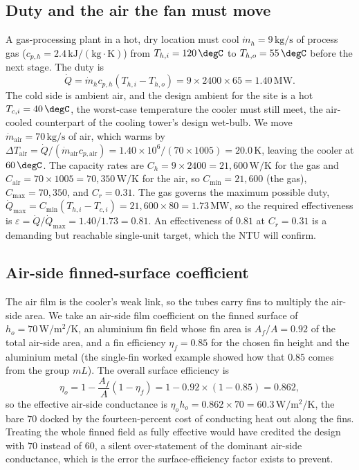 \subsection{Duty and the air the fan must move}

A gas-processing plant in a hot, dry location must cool $\dot{m}_h = 9\,\text{kg/s}$
of process gas ($c_{p,h} = 2.4\,\text{kJ}/(\text{kg}\cdot\si{\kelvin})$) from
$T_{h,i} = 120\,\degC$ to $T_{h,o} = 55\,\degC$ before the next stage. The duty is
\[
\dot{Q} = \dot{m}_h c_{p,h}(T_{h,i} - T_{h,o}) = 9\times 2400\times 65 = 1.40\,
\text{MW}.
\]
The cold side is ambient air, and the design ambient for the site is a hot
$T_{c,i} = 40\,\degC$, the worst-case temperature the cooler must still meet, the
air-cooled counterpart of the cooling tower's design wet-bulb. We move
$\dot{m}_{\text{air}} = 70\,\text{kg/s}$ of air, which warms by $\Delta T_{\text{
air}} = \dot{Q}/(\dot{m}_{\text{air}} c_{p,\text{air}}) = 1.40\times 10^6/(70\times
1005) = 20.0\,\si{\kelvin}$, leaving the cooler at $60\,\degC$. The capacity rates
are $C_h = 9\times 2400 = 21{,}600\,\si{\watt\per\kelvin}$ for the gas and
$C_{\text{air}} = 70\times 1005 = 70{,}350\,\si{\watt\per\kelvin}$ for the air, so
$C_{\min} = 21{,}600$ (the gas), $C_{\max} = 70{,}350$, and $C_r = 0.31$. The gas
governs the maximum possible duty, $\dot{Q}_{\max} = C_{\min}(T_{h,i} - T_{c,i}) =
21{,}600\times 80 = 1.73\,\text{MW}$, so the required effectiveness is
$\varepsilon = \dot{Q}/\dot{Q}_{\max} = 1.40/1.73 = 0.81$. An effectiveness of
$0.81$ at $C_r = 0.31$ is a demanding but reachable single-unit target, which the
NTU will confirm.

\subsection{Air-side finned-surface coefficient}

The air film is the cooler's weak link, so the tubes carry fins to multiply the
air-side area. We take an air-side film coefficient on the finned surface of
$h_o = 70\,\si{\watt\per\meter\squared\per\kelvin}$, an aluminium fin field whose
fin area is $A_f/A = 0.92$ of the total air-side area, and a fin efficiency
$\eta_f = 0.85$ for the chosen fin height and the aluminium metal (the single-fin
worked example showed how that $0.85$ comes from the group $mL$). The overall
surface efficiency is
\[
\eta_o = 1 - \frac{A_f}{A}(1 - \eta_f) = 1 - 0.92\times(1 - 0.85) = 0.862,
\]
so the effective air-side conductance is $\eta_o h_o = 0.862\times 70 = 60.3\,
\si{\watt\per\meter\squared\per\kelvin}$, the bare $70$ docked by the
fourteen-percent cost of conducting heat out along the fins. Treating the whole
finned field as fully effective would have credited the design with $70$ instead
of $60$, a silent over-statement of the dominant air-side conductance, which is
the error the surface-efficiency factor exists to prevent.

